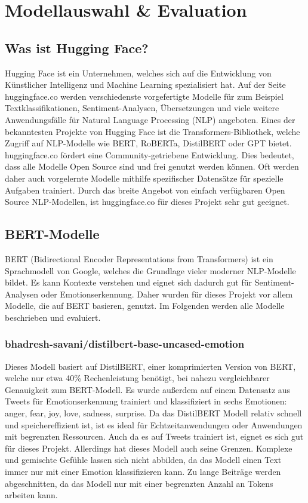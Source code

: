 \section{Modellauswahl \& Evaluation}

\subsection{Was ist Hugging Face?}
Hugging Face ist ein Unternehmen, welches sich auf die Entwicklung von Künstlicher Intelligenz und Machine Learning spezialisiert hat. Auf der Seite huggingface.co werden verschiedenste vorgefertigte Modelle für zum Beispiel Textklassifikationen, Sentiment-Analysen, Übersetzungen und viele weitere Anwendungsfälle für Natural Language Processing (NLP) angeboten. Eines der bekanntesten Projekte von Hugging Face ist die \newline
Transformers-Bibliothek, welche Zugriff auf NLP-Modelle wie BERT, RoBERTa, DistilBERT oder GPT bietet. huggingface.co fördert eine Community-getriebene Entwicklung. Dies bedeutet, dass alle Modelle Open Source sind und frei genutzt werden können. Oft werden daher auch vorgelernte Modelle mithilfe spezifischer Datensätze für spezielle Aufgaben trainiert. Durch das breite Angebot von einfach verfügbaren Open Source NLP-Modellen, ist huggingface.co für dieses Projekt sehr gut geeignet.

\subsection{BERT-Modelle}
BERT (Bidirectional Encoder Representations from Transformers) ist ein Sprachmodell von Google, welches die Grundlage vieler moderner NLP-Modelle bildet. Es kann Kontexte verstehen und eignet sich dadurch gut für Sentiment-Analysen oder Emotionserkennung. Daher wurden für dieses Projekt vor allem Modelle, die auf BERT basieren, genutzt. Im Folgenden werden alle Modelle beschrieben und evaluiert.

\subsubsection{bhadresh-savani/distilbert-base-uncased-emotion}
Dieses Modell basiert auf DistilBERT, einer komprimierten Version von BERT, welche nur etwa 40\% Rechenleistung benötigt, bei nahezu vergleichbarer Genauigkeit zum BERT-Modell. Es wurde außerdem auf einem Datensatz aus Tweets für Emotionserkennung trainiert und klassifiziert in sechs Emotionen: anger, fear, joy, love, sadness, surprise. Da das DistilBERT Modell relativ schnell und speichereffizient ist, ist es ideal für Echtzeitanwendungen oder Anwendungen mit begrenzten Ressourcen. Auch da es auf Tweets trainiert ist, eignet es sich gut für dieses Projekt. Allerdings hat dieses Modell auch seine Grenzen. Komplexe und gemischte Gefühle lassen sich nicht abbilden, da das Modell einen Text immer nur mit einer Emotion klassifizieren kann. Zu lange Beiträge werden abgeschnitten, da das Modell nur mit einer begrenzten Anzahl an Tokens arbeiten kann.

